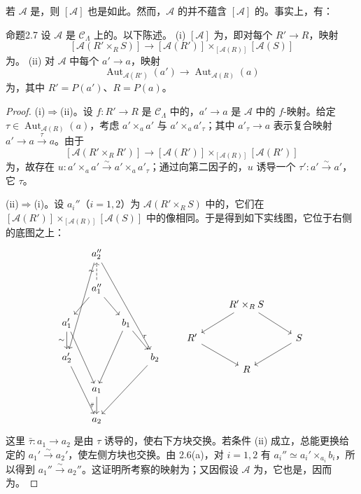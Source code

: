 若 $\mathcal A$ 是，则 $[\mathcal A]$ 也是如此。然而，$\mathcal A$ 的并不蕴含 $[\mathcal A]$ 的。事实上，有：
\begin{SGAresult}{命题}{2.7}
设 $\mathcal A$ 是 $\mathcal C_\Lambda$ 上的。以下陈述。
(i) $[\mathcal A]$ 为，即对每个 $R'\to R$，映射
\[[\mathcal A(R'\times_RS)]\longrightarrow[\mathcal A(R')]\times_{[\mathcal A(R)]}[\mathcal A(S)]\]
为。
(ii) 对 $\mathcal A$ 中每个 $a'\to a$，映射
\[\operatorname{Aut}_{\mathcal A(R')}(a')\longrightarrow\operatorname{Aut}_{\mathcal A(R)}(a)\]
为，其中 $R'=P(a')$、$R=P(a)$。
\end{SGAresult}
\begin{proof}
(i)$\Rightarrow$(ii)。设 $f:R'\to R$ 是 $\mathcal C_\Lambda$ 中的，$a'\to a$ 是 $\mathcal A$ 中的 $f$-映射。给定 $\tau\in\operatorname{Aut}_{\mathcal A(R)}(a)$，考虑 $a'\times_a a'$ 与 $a'\times_a a'_\tau$；其中 $a'_\tau\to a$ 表示复合映射 $a'\to a\xrightarrow\tau a$。由于
\[[\mathcal A(R'\times_RR')]\longrightarrow[\mathcal A(R')]\times_{[\mathcal A(R)]}[\mathcal A(R')]\]
为，故存在 $u:a'\times_a a'\xrightarrow\sim a'\times_a a'_\tau$；通过向第二因子的，$u$ 诱导一个 $\tau':a'\xrightarrow\sim a'$，它 $\tau$。

(ii)$\Rightarrow$(i)。设 $a_i''$（$i=1,2$）为 $\mathcal A(R'\times_RS)$ 中的，它们在
$[\mathcal A(R')]\times_{[\mathcal A(R)]}[\mathcal A(S)]$ 中的像相同。于是得到如下实线图，它位于右侧的底图之上：
\[
\begin{tikzcd}[column sep=small]
&a_2''\arrow[dddl]\arrow[dddrr] &\\
&a_1''\arrow[dl]\arrow[dr]\arrow[u,dashed,"\sim"]&\\
a_1'\arrow[ddr]\arrow[d,"\sim"']&&b_1\arrow[ddl]\arrow[dr,"\tau"]\\
a_2'\arrow[ddr]&&&b_2\arrow[ddll]\\
&a_1\arrow[d,"\bar\tau"']&&\\
&a_2&&
\end{tikzcd}
\qquad
\begin{tikzcd}&R'\times_RS\arrow[dl]\arrow[dr]\\R'\arrow[dr]&&S\arrow[dl]\\&R\end{tikzcd}
\]
这里 $\bar\tau:a_1\to a_2$ 是由 $\tau$ 诱导的，使右下方块交换。若条件 (ii) 成立，总能更换给定的 $a_1'\xrightarrow\sim a_2'$，使左侧方块也交换。由 2.6(a)，对 $i=1,2$ 有 $a_i''\simeq a_i'\times_{a_i}b_i$，所以得到 $a_1''\xrightarrow\sim a_2''$。这证明所考察的映射为；又因假设 $\mathcal A$ 为，它也是，因而为。
\end{proof}
